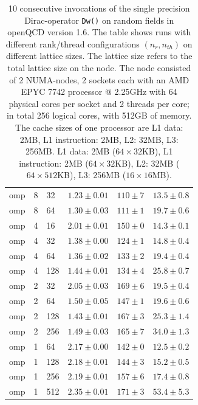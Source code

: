 \documentclass{article}
\theoremstyle{plain} %
\theoremstyle{convention} %
\theoremstyle{remark} %
\def\code#1{\texttt{#1}}
\numberwithin{equation}{section}
\begin{document}
\begin{table}
\begin{tabular}{ |p{1.5cm}||p{1cm}|p{1cm}|p{2cm}|p{2cm}|p{2cm}| }
        omp & 8 & 32 & $1.23 \pm 0.01$ & $110 \pm 7$ & $13.5 \pm 0.8$ \\
        omp & 8 & 64 & $1.30 \pm 0.03$ & $111 \pm 1$ & $19.7 \pm 0.6$ \\
        \hline
        omp & 4 & 16 & $2.01 \pm 0.01$ & $150 \pm 0$ & $14.3 \pm 0.1$ \\
        omp & 4 & 32 & $1.38 \pm 0.00$ & $124 \pm 1$ & $14.8 \pm 0.4$ \\
        omp & 4 & 64 & $1.36 \pm 0.02$ & $133 \pm 2$ & $19.4 \pm 0.4$ \\
        omp & 4 & 128 & $1.44 \pm 0.01$ & $134 \pm 4$ & $25.8 \pm 0.7$ \\
        \hline
        omp & 2 & 32 & $2.05 \pm 0.03$ & $169 \pm 6$ & $19.5 \pm 0.4$ \\
        omp & 2 & 64 & $1.50 \pm 0.05$ & $147 \pm 1$ & $19.6 \pm 0.6$ \\
        omp & 2 & 128 & $1.43 \pm 0.01$ & $167 \pm 3$ & $25.3 \pm 1.4$ \\
        omp & 2 & 256 & $1.49 \pm 0.03$ & $165 \pm 7$ & $34.0 \pm 1.3$ \\
        \hline
        omp & 1 & 64 & $2.17 \pm 0.00$ & $142 \pm 0$ & $12.5 \pm 0.2$ \\
        omp & 1 & 128 & $2.18 \pm 0.01$ & $144 \pm 3$ & $15.2 \pm 0.5$ \\
        omp & 1 & 256 & $2.19 \pm 0.01$ & $157 \pm 6$ & $17.4 \pm 0.8$ \\
        omp & 1 & 512 & $2.35 \pm 0.01$ & $171 \pm 3$ & $53.4 \pm 5.3$ \\
        \hline
    \end{tabular}
    \caption{\num{10} consecutive invocations of the single precision Dirac-operator \code{Dw()} on random fields in openQCD version 1.6. The table shows runs with different rank/thread configurations $(n_r, n_{th})$ on different lattice sizes. The lattice size refers to the total lattice size on the node. The node consisted of \num{2} NUMA-nodes, \num{2} sockets each with an AMD EPYC 7742 processor @ 2.25GHz with \num{64} physical cores per socket and \num{2} threads per core; in total \num{256} logical cores, with 512GB of memory. The cache sizes of one processor are L1 data: 2MB, L1 instruction: 2MB, L2: 32MB, L3: 256MB. L1 data: 2MB ($64 \times 32$KB), L1 instruction: 2MB ($64 \times 32$KB), L2: 32MB ($64 \times 512$KB), L3: 256MB ($16 \times 16$MB).}
    \label{tab:dop_omp_amd}
\end{table}
\end{document}
